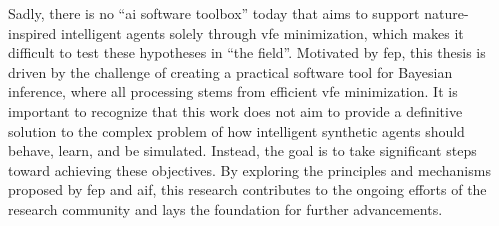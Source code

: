 Sadly, there is no ``\ac{ai} software toolbox'' today that aims to support nature-inspired
intelligent agents solely through \ac{vfe} minimization, which makes it difficult to test these hypotheses in ``the field''. 
Motivated by \ac{fep}, this thesis is driven by the challenge of creating a practical software tool for Bayesian inference, 
where all processing stems from efficient \ac{vfe} minimization.
It is important to recognize that this work does not aim to provide a definitive solution to the complex problem of how intelligent synthetic agents should behave, learn, and be simulated. Instead, the goal is to take significant steps toward achieving these objectives. By exploring the principles and mechanisms proposed by \ac{fep} and \ac{aif}, this research contributes to the ongoing efforts of the research community and lays the foundation for further advancements.
